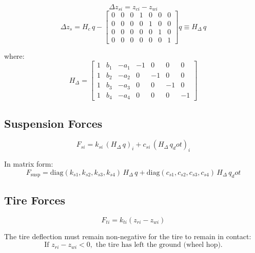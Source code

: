 \documentclass[11pt]{article}
\def\vect#1{#1}%
\def\dot#1{#1_dot}%
\newcommand{\vect}[1]{\bm{#1}}
\begin{document}
\begin{equation}
\Delta z_{si} = z_{ci} - z_{wi}
\end{equation}
\begin{equation}
\vect{\Delta z}_s = \vect{H}_c\,\vect{q} - \begin{bmatrix} 0 & 0 & 0 & 1 & 0 & 0 & 0 \\ 0 & 0 & 0 & 0 & 1 & 0 & 0 \\ 0 & 0 & 0 & 0 & 0 & 1 & 0 \\ 0 & 0 & 0 & 0 & 0 & 0 & 1 \end{bmatrix}\vect{q} \equiv \vect{H}_\Delta\,\vect{q}
\end{equation}

where:
\begin{equation}
\vect{H}_\Delta = \begin{bmatrix} 1 & b_1 & -a_1 & -1 & 0 & 0 & 0 \\ 1 & b_2 & -a_2 & 0 & -1 & 0 & 0 \\ 1 & b_3 & -a_3 & 0 & 0 & -1 & 0 \\ 1 & b_4 & -a_4 & 0 & 0 & 0 & -1 \end{bmatrix}
\end{equation}

\subsection{Suspension Forces}

\begin{equation}
\boxed{F_{si} = k_{si}\,(\vect{H}_\Delta\,\vect{q})_i + c_{si}\,(\vect{H}_\Delta\,\dot{\vect{q}})_i}
\end{equation}

In matrix form:
\begin{equation}
\vect{F}_{\text{susp}} = \mathrm{diag}(k_{s1},k_{s2},k_{s3},k_{s4})\,\vect{H}_\Delta\,\vect{q} + \mathrm{diag}(c_{s1},c_{s2},c_{s3},c_{s4})\,\vect{H}_\Delta\,\dot{\vect{q}}
\end{equation}

\subsection{Tire Forces}

\begin{equation}
F_{ti} = k_{ti}(z_{ri} - z_{wi})
\end{equation}

The tire deflection must remain non-negative for the tire to remain in contact:
\begin{equation}
\text{If } z_{ri} - z_{wi} < 0, \text{ the tire has left the ground (wheel hop).}
\end{equation}
\end{document}
